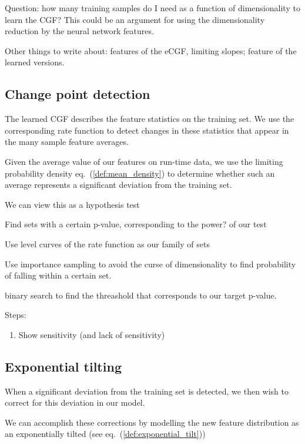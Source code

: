 \documentclass[10pt]{article}      %
\begin{document}
Question: how many training samples do I need as a function of dimensionality to learn the CGF? This could be an argument for using the dimensionality reduction by the neural network features.

Other things to write about: features of the eCGF, limiting slopes; feature of the learned versions.



\subsection{Change point detection}
The learned CGF describes the feature statistics on the training set.
We use the corresponding rate function to detect changes in these statistics that appear in the many sample feature averages. 


Given the average value of our features on run-time data, we use the limiting probability density eq.~(\ref{def:mean_density}) to determine whether such an average represents a significant deviation from the training set.

We can view this as a hypothesis test

Find sets with a certain p-value, corresponding to the power? of our test

Use level curves of the rate function as our family of sets

Use importance sampling to avoid the curse of dimensionality to find probability of falling within a certain set.

binary search to find the threashold that corresponds to our target p-value.




Steps:
\begin{enumerate}
  \item Show sensitivity (and lack of sensitivity)
\end{enumerate}



\subsection{Exponential tilting}

When a significant deviation from the training set is detected, we then wish to correct for this deviation in our model.

We can accomplish these corrections by modelling the new feature distribution as an exponentially tilted (see eq.~(\ref{def:exponential_tilt})) 
\end{document}
